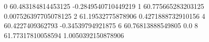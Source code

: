 0 60.483184814453125 -0.2849540710449219
1 60.775665283203125 0.007526397705078125
2 61.19532775878906 0.4271888732910156
4 60.4227409362793 -0.34539794921875
6 60.76813888549805 0.0
8 61.77317810058594 1.0050392150878906
